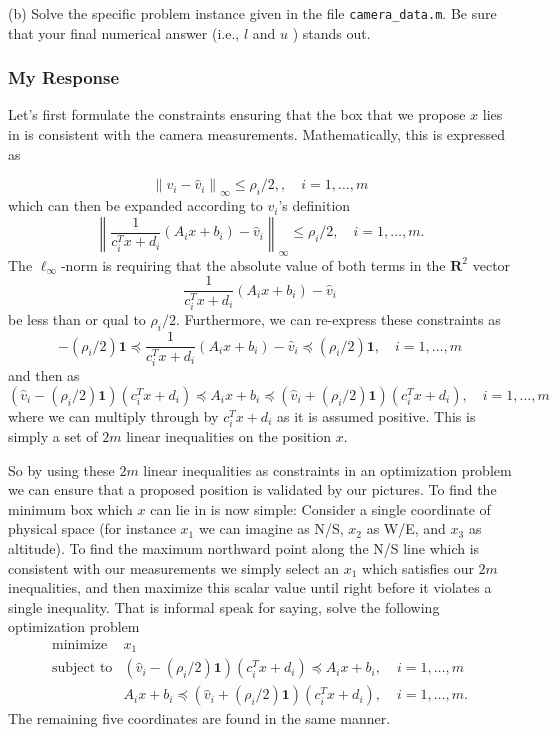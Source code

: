 \documentclass[12pt,reqno]{article}
\theoremstyle{definition}
\numberwithin{equation}{section}
\begin{document}
\vspace{0.1cm}
\noindent (b) Solve the specific problem instance given in the file \lstinline|camera_data.m|. Be sure that your final numerical answer (i.e., $l$ and $u$ ) stands out.

\subsubsection*{My Response}

Let's first formulate the constraints ensuring that the box that we propose $x$ lies in is consistent with the camera measurements.
Mathematically, this is expressed as

\[\left\lVert v_i - \hat{v}_i \right\rVert_{\infty} \le \rho_i / 2, , \quad i = 1, \ldots, m\]
which can then be expanded according to $v_i$'s definition
\[\left\lVert \frac{1}{c_i^T x+d_i}\left(A_i x+b_i\right) - \hat{v}_i \right\rVert_{\infty} \le \rho_i/2, \quad i = 1, \ldots, m.\]
The $\ell_{\infty}$-norm is requiring that the absolute value of both terms in the $\mathbf{R}^2$ vector
\[\frac{1}{c_i^T x+d_i}\left(A_i x+b_i\right) - \hat{v}_i\]
be less than or qual to $\rho_i/2$. Furthermore, we can re-express these constraints as
\[-(\rho_i/2) \bm{1} \preceq \frac{1}{c_i^T x+d_i}\left(A_i x+b_i\right) - \hat{v}_i \preceq (\rho_i/2) \bm{1}, \quad i = 1, \ldots, m\]
and then as
\[(\hat{v}_i - (\rho_i/2) \bm{1})(c_i^T x + d_i) \preceq A_i x + b_i \preceq (\hat{v}_i + (\rho_i/2)\bm{1})(c_i^Tx + d_i), \quad i = 1, \ldots, m\]
where we can multiply through by $c_i^Tx + d_i$ as it is assumed positive.
This is simply a set of $2m$ linear inequalities on the position $x$. 

\noindent So by using these $2m$ linear inequalities as constraints in an optimization problem we can ensure
that a proposed position is validated by our pictures. To find the minimum box which $x$ can lie in is now simple:
Consider a single coordinate of physical space (for instance $x_1$ we can imagine as N/S, $x_2$ as W/E,
and $x_3$ as altitude). To find the maximum northward point along the N/S line which is consistent with our measurements we simply select
an $x_1$ which satisfies our $2m$ inequalities, and then maximize this scalar value until right before it violates a single inequality.
That is informal speak for saying, solve the following optimization problem
\[\begin{array}{lll}
\text{minimize} \; & x_1 & \\
\text{subject to} & (\hat{v}_i - (\rho_i/2) \bm{1})(c_i^T x + d_i) \preceq A_i x + b_i, \; & i = 1, \ldots, m \\
& A_i x + b_i \preceq (\hat{v}_i + (\rho_i/2)\bm{1})(c_i^Tx + d_i), \; & i = 1, \ldots, m.
\end{array}\]
The remaining five coordinates are found in the same manner.
\end{document}
